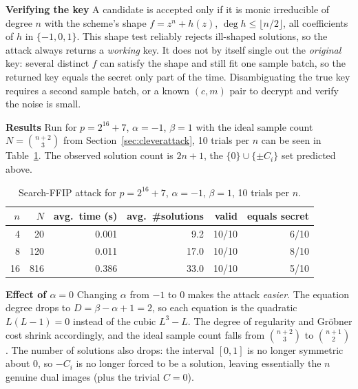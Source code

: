 \documentclass{article}
\begin{document}
\textbf{Verifying the key}
A candidate is accepted only if it is monic irreducible of degree $n$ with the scheme's shape $f=z^n+h(z)$, $\deg h\le\lfloor n/2\rfloor$, all coefficients of $h$ in $\{-1,0,1\}$. This shape test reliably rejects ill-shaped solutions, so the attack always returns a \emph{working} key. It does not by itself single out the \emph{original} key: several distinct $f$ can satisfy the shape and still fit one sample batch, so the returned key equals the secret only part of the time. Disambiguating the true key requires a second sample batch, or a known $(c,m)$ pair to decrypt and verify the noise is small.

\textbf{Results}
Run for $p=2^{16}+7$, $\alpha=-1$, $\beta=1$ with the ideal sample count $N=\binom{n+2}{3}$ from Section~\ref{sec:cleverattack}, 10 trials per $n$ can be seen in Table~\ref{tab:sffi}. The observed solution count is $2n+1$, the $\{0\}\cup\{\pm C_i\}$ set predicted above.

\begin{table}[h]
\centering
\begin{tabular}{r|r|r|r|r|r}
\hline
$n$ & $N$ & avg.\ time (s) & avg.\ \#solutions & valid & equals secret \\
\hline
4  & 20  & 0.001 & 9.2  & 10/10 & 6/10 \\
8  & 120 & 0.011 & 17.0 & 10/10 & 8/10 \\
16 & 816 & 0.386 & 33.0 & 10/10 & 5/10 \\
\hline
\end{tabular}
\caption{Search-FFIP attack for $p=2^{16}+7$, $\alpha=-1$, $\beta=1$, 10 trials per $n$.}
\label{tab:sffi}
\end{table}


\textbf{Effect of $\alpha=0$}
Changing $\alpha$ from $-1$ to $0$ makes the attack \emph{easier}. The equation degree drops to $D=\beta-\alpha+1=2$, so each equation is the quadratic $L(L-1)=0$ instead of the cubic $L^3-L$. The degree of regularity and Gröbner cost shrink accordingly, and the ideal sample count falls from $\binom{n+2}{3}$ to $\binom{n+1}{2}$. The number of solutions also drops: the interval $[0,1]$ is no longer symmetric about $0$, so $-C_i$ is no longer forced to be a solution, leaving essentially the $n$ genuine dual images (plus the trivial $C=0$).

\printbibliography
\end{document}
